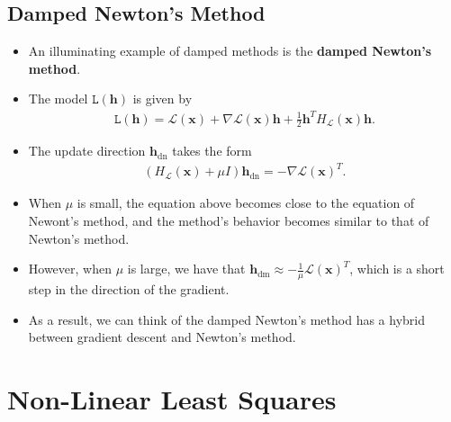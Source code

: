 \documentclass[10pt]{article}
\newcommand{\ve}[1]{\mathbf{#1}}
\newcommand{\mrm}[1]{\mathrm{#1}}
\newcommand{\mcal}[1]{\mathcal{#1}}
\begin{document}
\subsection{Damped Newton's Method}

\begin{itemize}
    \item An illuminating example of damped methods is the {\bf damped Newton's method}.
    
    \item The model $\mathtt{L}(\ve{h})$ is given by
    \begin{align*}
        \mathtt{L}(\ve{h}) = \mcal{L}(\ve{x}) + \nabla \mcal{L}(\ve{x})\ve{h} + \frac{1}{2} \ve{h}^T H_{\mcal{L}}(\ve{x}) \ve{h}.
    \end{align*}

    \item The update direction $\ve{h}_{\mrm{dn}}$ takes the form
    \begin{align*}
        (H_{\mcal{L}}(\ve{x}) + \mu I) \ve{h}_{\mrm{dn}} = - \nabla \mcal{L}(\ve{x})^T.
    \end{align*}

    \item When $\mu$ is small, the equation above becomes close to the equation of Newont's method, and the method's behavior becomes similar to that of Newton's method.
    
    \item However, when $\mu$ is large, we have that $\ve{h}_{\mrm{dm}} \approx -\frac{1}{\mu} \mcal{L}(\ve{x})^T$, which is a short step in the direction of the gradient.
    
    \item As a result, we can think of the damped Newton's method has a hybrid between gradient descent and Newton's method.
\end{itemize}

\section{Non-Linear Least Squares}
\end{document}

